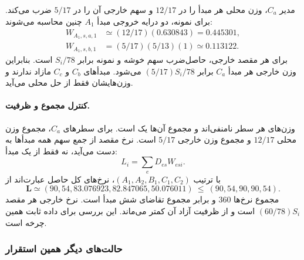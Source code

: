 مدیر $C_a$، وزن محلی هر مبدأ را در $12/17$ و سهم خارجی آن را در $5/17$ ضرب می‌کند. برای نمونه، دو درایه خروجی مبدأ $A_1$ چنین محاسبه می‌شوند:
\begin{align}
 W_{A_1,s,a,1}&\simeq(12/17)(0.630843)=0.445301,\\
 W_{A_1,s,b,1}&=(5/17)(5/13)(1)\simeq0.113122.
\end{align}
برای هر مقصد خارجی، حاصل‌ضرب سهم خوشه و نمونه برابر $S_i/78$ است. بنابراین وزن خارجی هر مبدأ $C_a$ برابر $(5/17)S_i/78$ می‌شود. مبدأهای $C_b$ و $C_c$ مازاد ندارند و وزن‌هایشان فقط از حل محلی می‌آید.

\paragraph{کنترل مجموع و ظرفیت.}
وزن‌های هر سطر نامنفی‌اند و مجموع آن‌ها یک است. برای سطرهای $C_a$، مجموع وزن محلی $12/17$ و مجموع وزن خارجی $5/17$ است. نرخ مقصد از جمع سهم همه مبدأها به دست می‌آید، نه فقط از یک مبدأ:
\begin{equation}
 L_i=\sum_e D_{es}W_{esi}.
\end{equation}
با ترتیب $(A_1,A_2,B_1,C_1,C_2)$، نرخ‌های کل حاصل عبارت‌اند از
\begin{equation}
 \boldsymbol L\simeq(90,54,83.076923,82.847065,50.076011)
 \ \leq\ (90,54,90,90,54).
\end{equation}
مجموع نرخ‌ها $360$ و برابر مجموع تقاضای شش مبدأ است. نرخ خارجی هر مقصد $(60/78)S_i$ است و از ظرفیت آزاد آن کمتر می‌ماند. این بررسی برای داده ثابت همین چرخه است.

\subsubsection{حالت‌های دیگر همین استقرار}

